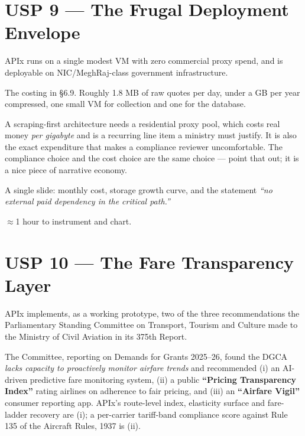 \section{USP 9 --- The Frugal Deployment Envelope}

\begin{uspbox}
 APIx runs on a single modest VM with zero commercial proxy spend, and is
deployable on NIC/MeghRaj-class government infrastructure.
\end{uspbox}

 The costing in \S6.9. Roughly 1.8 MB of raw quotes per day, under a GB
per year compressed, one small VM for collection and one for the database.

 A scraping-first architecture needs a residential proxy pool, which
costs real money \emph{per gigabyte} and is a recurring line item a ministry must justify. It
is also the exact expenditure that makes a compliance reviewer uncomfortable. The
compliance choice and the cost choice are the same choice --- point that out; it is a nice
piece of narrative economy.

 A single slide: monthly cost, storage growth curve, and the
statement \emph{``no external paid dependency in the critical path.''}

 $\approx$1 hour to instrument and chart.

\section{USP 10 --- The Fare Transparency Layer}

\begin{uspbox}
 APIx implements, as a working prototype, two of the three recommendations the
Parliamentary Standing Committee on Transport, Tourism and Culture made to the Ministry of
Civil Aviation in its 375th Report.
\end{uspbox}

 The Committee, reporting on Demands for Grants 2025--26, found the DGCA
\emph{lacks capacity to proactively monitor airfare trends} and recommended (i) an AI-driven
predictive fare monitoring system, (ii) a public \textbf{``Pricing Transparency Index''}
rating airlines on adherence to fair pricing, and (iii) an \textbf{``Airfare Vigil''}
consumer reporting app. APIx's route-level index, elasticity surface and fare-ladder
recovery are (i); a per-carrier tariff-band compliance score against Rule 135 of the Aircraft
Rules, 1937 is (ii).

